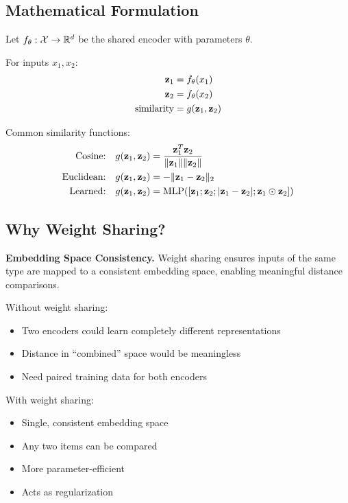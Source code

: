 \subsection{Mathematical Formulation}

Let $f_\theta: \mathcal{X} \to \mathbb{R}^d$ be the shared encoder with parameters $\theta$.

For inputs $x_1, x_2$:
\begin{align}
\mathbf{z}_1 &= f_\theta(x_1) \\
\mathbf{z}_2 &= f_\theta(x_2) \\
\text{similarity} &= g(\mathbf{z}_1, \mathbf{z}_2)
\end{align}

Common similarity functions:
\begin{align}
\text{Cosine:} \quad g(\mathbf{z}_1, \mathbf{z}_2) &= \frac{\mathbf{z}_1^T \mathbf{z}_2}{\|\mathbf{z}_1\| \|\mathbf{z}_2\|} \\
\text{Euclidean:} \quad g(\mathbf{z}_1, \mathbf{z}_2) &= -\|\mathbf{z}_1 - \mathbf{z}_2\|_2 \\
\text{Learned:} \quad g(\mathbf{z}_1, \mathbf{z}_2) &= \text{MLP}([\mathbf{z}_1; \mathbf{z}_2; |\mathbf{z}_1 - \mathbf{z}_2|; \mathbf{z}_1 \odot \mathbf{z}_2])
\end{align}

\subsection{Why Weight Sharing?}

\textbf{Embedding Space Consistency.} Weight sharing ensures inputs of the same type are mapped to a consistent embedding space, enabling meaningful distance comparisons.

Without weight sharing:
\begin{itemize}
    \item Two encoders could learn completely different representations
    \item Distance in ``combined'' space would be meaningless
    \item Need paired training data for both encoders
\end{itemize}

With weight sharing:
\begin{itemize}
    \item Single, consistent embedding space
    \item Any two items can be compared
    \item More parameter-efficient
    \item Acts as regularization
\end{itemize}

